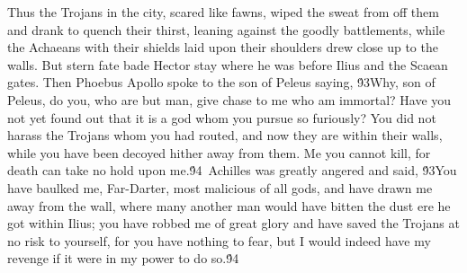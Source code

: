{  Thus the Trojans in the city, scared like fawns, wiped the sweat from off them and drank to quench their thirst, leaning against the goodly battlements, while the Achaeans with their shields laid upon their shoulders drew close up to the walls. But stern fate bade Hector stay where he was before Ilius and the Scaean gates. Then Phoebus Apollo spoke to the son of Peleus saying, \'93Why, son of Peleus, do you, who are but man, give chase to me who am immortal? Have you not yet found out that it is a god whom you pursue so furiously? You did not harass the Trojans whom you had routed, and now they are within their walls, while you have been decoyed hither away from them. Me you cannot kill, for death can take no hold upon me.\'94\
Achilles was greatly angered and said, \'93You have baulked me, Far-Darter, most malicious of all gods, and have drawn me away from the wall, where many another man would have bitten the dust ere he got within Ilius; you have robbed me of great glory and have saved the Trojans at no risk to yourself, for you have nothing to fear, but I would indeed have my revenge if it were in my power to do so.\'94\
}
